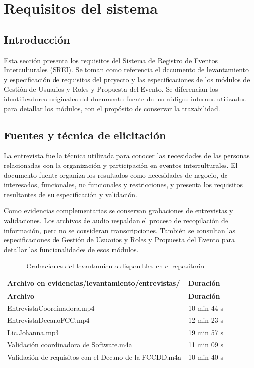 \section{Requisitos del sistema}

\subsection{Introducción}
Esta sección presenta los requisitos del Sistema de Registro de Eventos Interculturales (SREI). Se toman como referencia el documento de levantamiento y especificación de requisitos del proyecto y las especificaciones de los módulos de Gestión de Usuarios y Roles y Propuesta del Evento. Se diferencian los identificadores originales del documento fuente de los códigos internos utilizados para detallar los módulos, con el propósito de conservar la trazabilidad.

\subsection{Fuentes y técnica de elicitación}
La entrevista fue la técnica utilizada para conocer las necesidades de las personas relacionadas con la organización y participación en eventos interculturales. El documento fuente organiza los resultados como necesidades de negocio, de interesados, funcionales, no funcionales y restricciones, y presenta los requisitos resultantes de su especificación y validación.

Como evidencias complementarias se conservan grabaciones de entrevistas y validaciones. Los archivos de audio respaldan el proceso de recopilación de información, pero no se consideran transcripciones. También se consultan las especificaciones de Gestión de Usuarios y Roles y Propuesta del Evento para detallar las funcionalidades de esos módulos.

\begin{longtable}{P{0.66\textwidth} P{0.24\textwidth}}
\caption{Grabaciones del levantamiento disponibles en el repositorio}\\
\toprule
\textbf{Archivo en evidencias/levantamiento/entrevistas/} & \textbf{Duración}\\
\midrule
\endfirsthead
\toprule
\textbf{Archivo} & \textbf{Duración}\\
\midrule
\endhead
EntrevistaCoordinadora.mp4 & 10 min 44 s\\
EntrevistaDecanoFCC.mp4 & 12 min 23 s\\
Lic.Johanna.mp3 & 19 min 57 s\\
Validación coordinadora de Software.m4a & 11 min 09 s\\
Validación de requisitos con el Decano de la FCCDD.m4a & 10 min 40 s\\
\bottomrule
\end{longtable}

